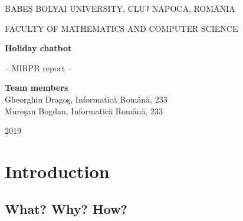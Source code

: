 \documentclass[runningheads,a4paper,11pt]{report}
\begin{document}
\begin{titlepage}
\sloppy
\begin{center}
BABE\c S BOLYAI UNIVERSITY, CLUJ NAPOCA, ROM\^ ANIA

FACULTY OF MATHEMATICS AND COMPUTER SCIENCE

\vspace{6cm}

\Huge \textbf{Holiday chatbot}

\vspace{1cm}

\normalsize -- MIRPR report --

\end{center}


\vspace{5cm}

\begin{flushright}
\Large{\textbf{Team members}}\\
Gheorghiu Drago\c s, Informatic\u a Rom\^ an\u a, 233\\
Mure\c san Bogdan, Informatic\u a Rom\^ an\u a, 233\\
\end{flushright}

\vspace{4cm}

\begin{center}
2019
\end{center}

\end{titlepage}



\tableofcontents

\newpage

\listoftables
\listoffigures
\listofalgorithms

\newpage




\newpage



 


\chapter{Introduction}
\label{chapter:introduction}

\section{What? Why? How?}
\label{section:what}
\end{document}
